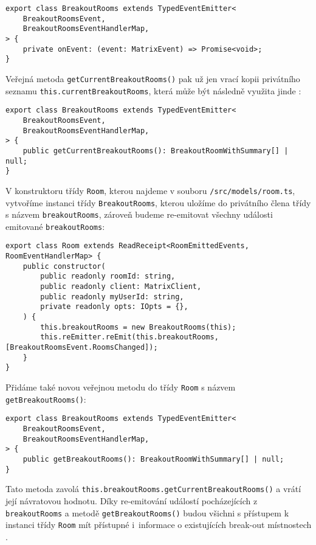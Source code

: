 \begin{verbatim}
export class BreakoutRooms extends TypedEventEmitter<
	BreakoutRoomsEvent,
	BreakoutRoomsEventHandlerMap,
> {
	private onEvent: (event: MatrixEvent) => Promise<void>;
}
\end{verbatim}

Veřejná metoda \texttt{getCurrentBreakoutRooms()} pak už jen
vrací kopii privátního seznamu
\texttt{this.currentBreakoutRooms}, která může být následně
využita jinde \parencite{GitHub-MatrixJSSDK-BreakoutRooms}:

\begin{verbatim}
export class BreakoutRooms extends TypedEventEmitter<
	BreakoutRoomsEvent,
	BreakoutRoomsEventHandlerMap,
> {
	public getCurrentBreakoutRooms(): BreakoutRoomWithSummary[] | null;
}
\end{verbatim}

V konstruktoru třídy \texttt{Room}, kterou najdeme v souboru
\texttt{/src/models/room.ts}, vytvoříme instanci třídy
\texttt{BreakoutRooms}, kterou uložíme do privátního člena třídy
s názvem \texttt{breakoutRooms}, zároveň budeme re-emitovat
všechny události emitované \texttt{breakoutRooms}:

\begin{verbatim}
export class Room extends ReadReceipt<RoomEmittedEvents, RoomEventHandlerMap> {
	public constructor(
		public readonly roomId: string,
		public readonly client: MatrixClient,
		public readonly myUserId: string,
		private readonly opts: IOpts = {},
	) {
		this.breakoutRooms = new BreakoutRooms(this);
		this.reEmitter.reEmit(this.breakoutRooms, [BreakoutRoomsEvent.RoomsChanged]);
	}
}
\end{verbatim}

Přidáme také
novou veřejnou metodu do třídy \texttt{Room} s názvem
\texttt{getBreakoutRooms()}:

\begin{verbatim}
export class BreakoutRooms extends TypedEventEmitter<
	BreakoutRoomsEvent,
	BreakoutRoomsEventHandlerMap,
> {
	public getBreakoutRooms(): BreakoutRoomWithSummary[] | null;
}
\end{verbatim}

Tato metoda zavolá
\texttt{this.breakoutRooms.getCurrentBreakoutRooms()} a vrátí
její návratovou hodnotu. Díky re-emitování událostí pocházejících z
\texttt{breakoutRooms} a metodě
\texttt{getBreakoutRooms()} budou všichni s přístupem k instanci
třídy \texttt{Room} mít přístupné i~informace o existujících
break-out místnostech \parencite{GitHub-MatrixJSSDK-BreakoutRooms}.


